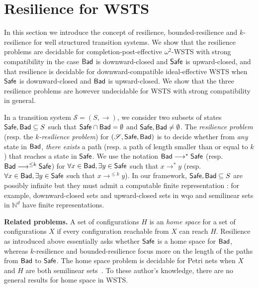 
\section{Resilience for WSTS}


In this section we introduce the concept of resilience, bounded-resilience and $k$-resilience for well structured transition systems. We show that the resilience problems are decidable
for  completion-post-effective $\omega^2$-WSTS with strong compatibility
in the case $\textsf{Bad}$ is downward-closed and $\textsf{Safe} $ is upward-closed,
and that resilience is decidable for downward-compatible ideal-effective WSTS
when $\textsf{Safe}$ is downward-closed and $\textsf{Bad} $ is upward-closed. 
We show that the three resilience problems are however undecidable for WSTS with
strong compatibility in general.


In a transition system $\mathscr{S}=(S,\rightarrow)$, we consider two subsets of states $\textsf{Safe}, \textsf{Bad} \subseteq S$ such that $\textsf{Safe} \cap  \textsf{Bad} = \emptyset$ and $\textsf{Safe} ,  \textsf{Bad} \neq \emptyset$.
The \emph{resilience problem} (resp. the \emph{$k$-resilience problem}) for $(\mathscr{S},\textsf{Safe},\textsf{Bad})$ is to decide whether from \emph{any} state in $\textsf{Bad}$, \emph{there exists} a path (resp. a path of length smaller than or equal to $k$) that reaches a state in $\textsf{Safe}$. We use the notation $\textsf{Bad} \longrightarrow^{*} \textsf{Safe}$ (resp. $\textsf{Bad} \longrightarrow^{\leq k} \textsf{Safe}$) for $\forall x \in \textsf{Bad}, \exists y \in \textsf{Safe}$ such that $x \longrightarrow^{*} y$ (resp.  $\forall x \in \textsf{Bad}, \exists y \in \textsf{Safe}$ such that $x \longrightarrow^{\leq k} y$). In our framework, $\textsf{Safe}, \textsf{Bad} \subseteq S$  are possibly infinite but they must admit a computable finite representation : for example, downward-closed sets and upward-closed sets in wqo and semilinear sets in $\mathbb{N}^d$ have finite representations. 


{\bf Related problems.} 
A set of configurations $H$ is an {\em home space} for a set of configurations $X$ if every configuration reachable from $X$ can reach $H$. Resilience as introduced above essentially asks whether $\textsf{Safe}$ is a home space for $\textsf{Bad}$, whereas $k$-resilience and bounded-resilience focus more on the length of the paths from $\textsf{Bad}$ to $\textsf{Safe}$. The home space problem is decidable for
Petri nets when $X$ and $H$ are both semilinear sets~\cite{DBLP:journals/corr/abs-2207-02697}.
To these author's knowledge, there are no general results for home space in WSTS.


